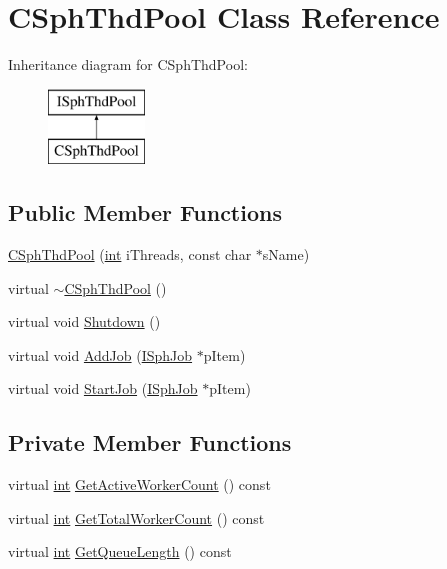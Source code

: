 \hypertarget{classCSphThdPool}{\section{C\-Sph\-Thd\-Pool Class Reference}
\label{classCSphThdPool}
}
Inheritance diagram for C\-Sph\-Thd\-Pool\-:\begin{figure}[H]
\begin{center}
\leavevmode
\includegraphics[height=2.000000cm]{classCSphThdPool}
\end{center}
\end{figure}
\subsection*{Public Member Functions}
\begin{DoxyCompactItemize}
\item 
\hyperlink{classCSphThdPool_a0e15d82b53a3d69a90633ce7cbc3a008}{C\-Sph\-Thd\-Pool} (\hyperlink{sphinxexpr_8cpp_a4a26e8f9cb8b736e0c4cbf4d16de985e}{int} i\-Threads, const char $\ast$s\-Name)
\item 
virtual \hyperlink{classCSphThdPool_a057dd660e531c539879cd6ffa1650336}{$\sim$\-C\-Sph\-Thd\-Pool} ()
\item 
virtual void \hyperlink{classCSphThdPool_ac2809ea06b5936abd8fac12563b5b1af}{Shutdown} ()
\item 
virtual void \hyperlink{classCSphThdPool_ae72a692ed3935ad5ee5c57474376e984}{Add\-Job} (\hyperlink{structISphJob}{I\-Sph\-Job} $\ast$p\-Item)
\item 
virtual void \hyperlink{classCSphThdPool_acd8432ab0685b5ce5ef515e0c55a2626}{Start\-Job} (\hyperlink{structISphJob}{I\-Sph\-Job} $\ast$p\-Item)
\end{DoxyCompactItemize}
\subsection*{Private Member Functions}
\begin{DoxyCompactItemize}
\item 
virtual \hyperlink{sphinxexpr_8cpp_a4a26e8f9cb8b736e0c4cbf4d16de985e}{int} \hyperlink{classCSphThdPool_ac9babbb3b4c59d2c3191b401622ca0ee}{Get\-Active\-Worker\-Count} () const 
\item 
virtual \hyperlink{sphinxexpr_8cpp_a4a26e8f9cb8b736e0c4cbf4d16de985e}{int} \hyperlink{classCSphThdPool_a9a9ebaf12e8fe5d260a87320e6a490e3}{Get\-Total\-Worker\-Count} () const 
\item 
virtual \hyperlink{sphinxexpr_8cpp_a4a26e8f9cb8b736e0c4cbf4d16de985e}{int} \hyperlink{classCSphThdPool_a41117ca8f76ced40e468d4678a029fd8}{Get\-Queue\-Length} () const 
\end{DoxyCompactItemize}
